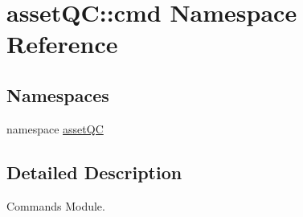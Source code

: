 \hypertarget{namespaceassetQC_1_1cmd}{\section{asset\-Q\-C\-:\-:cmd \-Namespace \-Reference}
\label{d1/d6a/namespaceassetQC_1_1cmd}
}
\subsection*{\-Namespaces}
\begin{DoxyCompactItemize}
\item 
namespace \hyperlink{namespaceassetQC_1_1cmd_1_1assetQC}{asset\-Q\-C}
\end{DoxyCompactItemize}


\subsection{\-Detailed \-Description}
\begin{DoxyVerb}
Commands Module.
\end{DoxyVerb}
 